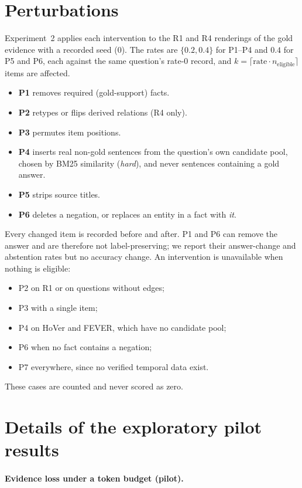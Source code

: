 \section{Perturbations}
\label{app:perturbations}

Experiment~2 applies each intervention to the R1 and R4 renderings of the gold evidence with a recorded seed (0). The rates are $\{0.2, 0.4\}$ for P1--P4 and $0.4$ for P5 and P6, each against the same question's rate-0 record, and $k=\lceil \text{rate}\cdot n_{\text{eligible}}\rceil$ items are affected.
\begin{itemize}
\item \textbf{P1} removes required (gold-support) facts.
\item \textbf{P2} retypes or flips derived relations (R4 only).
\item \textbf{P3} permutes item positions.
\item \textbf{P4} inserts real non-gold sentences from the question's own candidate pool, chosen by BM25 similarity (\emph{hard}), and never sentences containing a gold answer.
\item \textbf{P5} strips source titles.
\item \textbf{P6} deletes a negation, or replaces an entity in a fact with \emph{it}.
\end{itemize}
Every changed item is recorded before and after. P1 and P6 can remove the answer and are therefore not label-preserving; we report their answer-change and abstention rates but no accuracy change. An intervention is unavailable when nothing is eligible:
\begin{itemize}
\item P2 on R1 or on questions without edges;
\item P3 with a single item;
\item P4 on HoVer and FEVER, which have no candidate pool;
\item P6 when no fact contains a negation;
\item P7 everywhere, since no verified temporal data exist.
\end{itemize}
These cases are counted and never scored as zero.

\section{Details of the exploratory pilot results}
\label{app:pilot}

\paragraph{Evidence loss under a token budget (pilot).}

